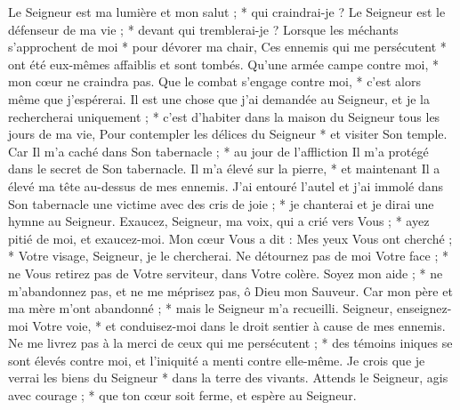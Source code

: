  Le Seigneur est ma lumière et mon salut ; * qui craindrai-je ?
\versseparator
 Le Seigneur est le défenseur de ma vie ; * devant qui tremblerai-je ?
\versseparator
 Lorsque les méchants s'approchent de moi * pour dévorer ma chair,
\versseparator
 Ces ennemis qui me persécutent * ont été eux-mêmes affaiblis et sont tombés.
\versseparator
 Qu'une armée campe contre moi, * mon cœur ne craindra pas.
\versseparator
 Que le combat s'engage contre moi, * c'est alors même que j'espérerai.
\versseparator
 Il est une chose que j'ai demandée au Seigneur, et je la rechercherai uniquement ; * c'est d'habiter dans la maison du Seigneur tous les jours de ma vie,
\versseparator
 Pour contempler les délices du Seigneur * et visiter Son temple.
\versseparator
 Car Il m'a caché dans Son tabernacle ; * au jour de l'affliction Il m'a protégé dans le secret de Son tabernacle.
\versseparator
 Il m'a élevé sur la pierre, * et maintenant Il a élevé ma tête au-dessus de mes ennemis.
\versseparator
 J'ai entouré l'autel et j'ai immolé dans Son tabernacle une victime avec des cris de joie ; * je chanterai et je dirai une hymne au Seigneur.
\versseparator
 Exaucez, Seigneur, ma voix, qui a crié vers Vous ; * ayez pitié de moi, et exaucez-moi.
\versseparator
 Mon cœur Vous a dit : Mes yeux Vous ont cherché ; * Votre visage, Seigneur, je le chercherai.
\versseparator
 Ne détournez pas de moi Votre face ; * ne Vous retirez pas de Votre serviteur, dans Votre colère.
\versseparator
 Soyez mon aide ; * ne m'abandonnez pas, et ne me méprisez pas, ô Dieu mon Sauveur.
\versseparator
 Car mon père et ma mère m'ont abandonné ; * mais le Seigneur m'a recueilli.
\versseparator
 Seigneur, enseignez-moi Votre voie, * et conduisez-moi dans le droit sentier à cause de mes ennemis.
\versseparator
 Ne me livrez pas à la merci de ceux qui me persécutent ; * des témoins iniques se sont élevés contre moi, et l'iniquité a menti contre elle-même.
\versseparator
 Je crois que je verrai les biens du Seigneur * dans la terre des vivants.
\versseparator
 Attends le Seigneur, agis avec courage ; * que ton cœur soit ferme, et espère au Seigneur.